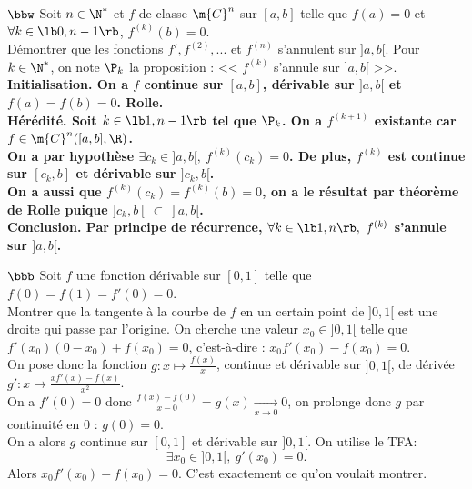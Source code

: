 \documentclass[11pt]{article}
\begin{document}
\begin{exercice}{$\bbw$}{}
    Soit $n\in\N^*$ et $f$ de classe $\m{C}^n$ sur $[a,b]$ telle que $f(a)=0$ et $\forall k \in \lb0,n-1\rb$, $f^{(k)}(b)=0$.\\
    Démontrer que les fonctions $f',f^{(2)},...$ et $f^{(n)}$ s'annulent sur $]a,b[$.
    \tcblower
    Pour $k\in\N^*$, on note $\P_k$ la proposition : << $f^{(k)}$ s'annule sur $]a,b[$ >>.\\
    \bf{Initialisation.} On a $f$ continue sur $[a,b]$, dérivable sur $]a,b[$ et $f(a)=f(b)=0$. Rolle.\\
    \bf{Hérédité.} Soit $k\in\lb1,n-1\rb$ tel que $\P_k$. On a $f^{(k+1)}$ existante car $f\in\m{C}^n([a,b],\R)$.\\
    On a par hypothèse $\exists c_k \in ]a,b[, ~ f^{(k)}(c_k)=0$. De plus, $f^{(k)}$ est continue sur $[c_k,b]$ et dérivable sur $]c_k,b[$.\\
    On a aussi que $f^{(k)}(c_k)=f^{(k)}(b)=0$, on a le résultat par théorème de Rolle puique $]c_k,b[~\subset~]a,b[$.\\
    \bf{Conclusion.} Par principe de récurrence, $\forall k \in \lb1,n\rb, ~ f^{(k)}$ s'annule sur $]a,b[$.
\end{exercice}

\begin{exercice}{$\bbb$}{}
    Soit $f$ une fonction dérivable sur $[0,1]$ telle que $f(0)=f(1)=f'(0)=0$.\\
    Montrer que la tangente à la courbe de $f$ en un certain point de $]0,1[$ est une droite qui passe par l'origine.
    \tcblower
    On cherche une valeur $x_0\in]0,1[$ telle que $f'(x_0)(0-x_0)+f(x_0)=0$, c'est-à-dire : $x_0f'(x_0)-f(x_0)=0$.\\
    On pose donc la fonction $g:x\mapsto\frac{f(x)}{x}$, continue et dérivable sur $]0,1[$, de dérivée $g':x\mapsto\frac{xf'(x)-f(x)}{x^2}$.\\
    On a $f'(0)=0$ donc $\frac{f(x)-f(0)}{x-0}=g(x)\xrightarrow[x\to0]{}0$, on prolonge donc $g$ par continuité en 0 : $g(0)=0$.\\
    On a alors $g$ continue sur $[0,1]$ et dérivable sur $]0,1[$. On utilise le TFA:
    \begin{equation*}
        \exists x_0 \in ]0,1[, ~ g'(x_0)=0.
    \end{equation*}
    Alors $x_0f'(x_0)-f(x_0)=0$. C'est exactement ce qu'on voulait montrer.
\end{exercice}

\vspace*{0.4cm}
\end{document}

